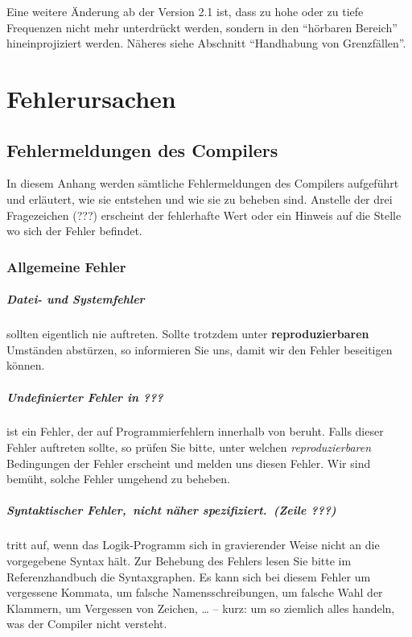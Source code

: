 Eine weitere Änderung ab der Version 2.1 ist, dass zu hohe oder zu
tiefe Frequenzen nicht mehr unterdrückt werden, sondern in den
"`hörbaren Bereich"' hineinprojiziert werden. Näheres siehe Abschnitt
"`Handhabung von Grenzfällen"'.

\chapter{Fehlerursachen}\label{cha:fehlerursachen}

\section{Fehlermeldungen des Compilers}\label{sec:fehl-des-comp}

In diesem Anhang werden sämtliche Fehlermeldungen des Compilers
aufgeführt und erläutert, wie sie entstehen und wie sie
zu beheben sind. Anstelle der drei Fragezeichen (???)
erscheint der fehlerhafte Wert oder ein Hinweis auf
die Stelle wo sich der Fehler befindet.

\subsection{Allgemeine Fehler}\label{sec:allgemeine-fehler}

\paragraph{Datei- und Systemfehler} sollten eigentlich nie
auftreten. Sollte \mutabor{} trotzdem unter \textbf{reproduzierbaren}
Umständen abstürzen, so informieren Sie uns, damit
wir den Fehler beseitigen können.

\paragraph{Undefinierter Fehler in ???} ist ein Fehler, der
auf Programmierfehlern innerhalb von \mutabor{} beruht. Falls
dieser Fehler auftreten sollte, so prüfen Sie bitte, unter welchen
\emph{reproduzierbaren} Bedingungen der Fehler erscheint und melden
uns diesen Fehler. Wir sind bemüht, solche Fehler umgehend zu
beheben.

\paragraph{Syntaktischer Fehler,\ nicht näher spezifiziert.\ (Zeile ???)}
tritt auf, wenn das Lo\-gik-\-Pro\-gramm sich in gravierender Weise
nicht an die vorgegebene Syntax hält. Zur Behebung des Fehlers lesen
Sie bitte im Referenzhandbuch die Syntaxgraphen. Es kann sich bei
diesem Fehler um vergessene Kommata, um falsche Namensschreibungen, um
falsche Wahl der Klammern, um Vergessen von Zeichen, \dots{} -- kurz: um
so ziemlich alles handeln, was der Compiler nicht versteht.

